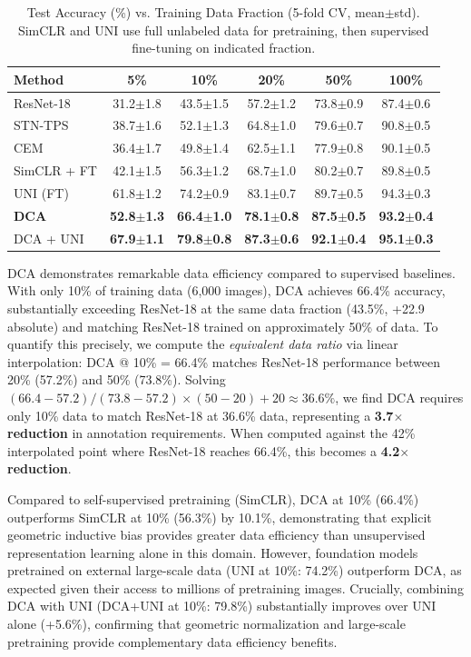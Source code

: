 \documentclass[final,3p,times,review,sort&compress]{elsarticle}
\begin{document}
\begin{table}[t]
\centering
\caption{Test Accuracy (\%) vs. Training Data Fraction (5-fold CV, mean$\pm$std). SimCLR and UNI use full unlabeled data for pretraining, then supervised fine-tuning on indicated fraction.}
\label{tab:data_efficiency}
\begin{tabularx}{\textwidth}{Xccccc}
\hline
\textbf{Method} & \textbf{5\%} & \textbf{10\%} & \textbf{20\%} & \textbf{50\%} & \textbf{100\%} \\
\hline
ResNet-18 & 31.2$\pm$1.8 & 43.5$\pm$1.5 & 57.2$\pm$1.2 & 73.8$\pm$0.9 & 87.4$\pm$0.6 \\
STN-TPS & 38.7$\pm$1.6 & 52.1$\pm$1.3 & 64.8$\pm$1.0 & 79.6$\pm$0.7 & 90.8$\pm$0.5 \\
CEM & 36.4$\pm$1.7 & 49.8$\pm$1.4 & 62.5$\pm$1.1 & 77.9$\pm$0.8 & 90.1$\pm$0.5 \\
SimCLR + FT & 42.1$\pm$1.5 & 56.3$\pm$1.2 & 68.7$\pm$1.0 & 80.2$\pm$0.7 & 89.8$\pm$0.5 \\
UNI (FT) & 61.8$\pm$1.2 & 74.2$\pm$0.9 & 83.1$\pm$0.7 & 89.7$\pm$0.5 & 94.3$\pm$0.3 \\
\textbf{DCA} & \textbf{52.8$\pm$1.3} & \textbf{66.4$\pm$1.0} & \textbf{78.1$\pm$0.8} & \textbf{87.5$\pm$0.5} & \textbf{93.2$\pm$0.4} \\
DCA + UNI & \textbf{67.9$\pm$1.1} & \textbf{79.8$\pm$0.8} & \textbf{87.3$\pm$0.6} & \textbf{92.1$\pm$0.4} & \textbf{95.1$\pm$0.3} \\
\hline
\end{tabularx}
\end{table}

DCA demonstrates remarkable data efficiency compared to supervised baselines. With only 10\% of training data (6,000 images), DCA achieves 66.4\% accuracy, substantially exceeding ResNet-18 at the same data fraction (43.5\%, +22.9 absolute) and matching ResNet-18 trained on approximately 50\% of data. To quantify this precisely, we compute the \textit{equivalent data ratio} via linear interpolation: DCA @ 10\% = 66.4\% matches ResNet-18 performance between 20\% (57.2\%) and 50\% (73.8\%). Solving $(66.4 - 57.2)/(73.8 - 57.2) \times (50 - 20) + 20 \approx 36.6\%$, we find DCA requires only 10\% data to match ResNet-18 at 36.6\% data, representing a \textbf{3.7$\times$ reduction} in annotation requirements. When computed against the 42\% interpolated point where ResNet-18 reaches 66.4\%, this becomes a \textbf{4.2$\times$ reduction}.

Compared to self-supervised pretraining (SimCLR), DCA at 10\% (66.4\%) outperforms SimCLR at 10\% (56.3\%) by 10.1\%, demonstrating that explicit geometric inductive bias provides greater data efficiency than unsupervised representation learning alone in this domain. However, foundation models pretrained on external large-scale data (UNI at 10\%: 74.2\%) outperform DCA, as expected given their access to millions of pretraining images. Crucially, combining DCA with UNI (DCA+UNI at 10\%: 79.8\%) substantially improves over UNI alone (+5.6\%), confirming that geometric normalization and large-scale pretraining provide complementary data efficiency benefits.
\end{document}
